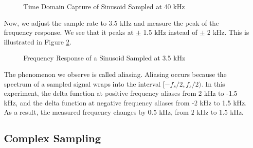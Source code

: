 \documentclass{article}
\begin{document}
\begin{figure}[H]
	\centerline{}
	\caption{Time Domain Capture of Sinusoid Sampled at 40 kHz}
	\label{fig::sampling_rates_time_domain_40k_samp_rate}
\end{figure}

Now, we adjust the sample rate to 3.5 kHz and measure the peak of the frequency response. We see that it peaks at $\pm$ 1.5 kHz instead of $\pm$ 2 kHz. This is illustrated in Figure \ref{fig::sampling_rates_freq_domain_3_5k_samp_rate}.

\begin{figure}[H]
	\centerline{}
	\caption{Frequency Response of a Sinusoid Sampled at 3.5 kHz}
	\label{fig::sampling_rates_freq_domain_3_5k_samp_rate}
\end{figure}

The phenomenon we observe is called aliasing. Aliasing occurs because the spectrum of a sampled signal wraps into the interval $[-f_s/2, f_s/2)$. In this experiment, the delta function at positive frequency aliases from 2 kHz to -1.5 kHz, and the delta function at negative frequency aliases from -2 kHz to 1.5 kHz. As a result, the measured frequency changes by 0.5 kHz, from 2 kHz to 1.5 kHz.

\subsection{Complex Sampling}
\end{document}
